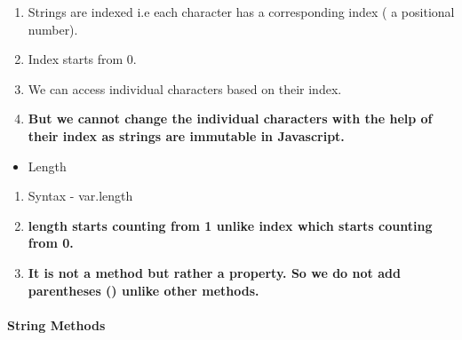 \documentclass[
  paper=a4,
  ,captions=tableheading
]{scrartcl}
\providecommand{\tightlist}{%
  \setlength{\itemsep}{0pt}\setlength{\parskip}{0pt}}
\begin{document}
\begin{enumerate}
\def\labelenumi{\arabic{enumi}.}
\tightlist
\item
  Strings are indexed i.e each character has a corresponding index ( a
  positional number).
\item
  Index starts from 0.
\item
  We can access individual characters based on their index.
\item
  \textbf{But we cannot change the individual characters with the help
  of their index as strings are immutable in Javascript.}
\end{enumerate}

\begin{itemize}
\tightlist
\item
  Length
\end{itemize}

\begin{enumerate}
\def\labelenumi{\arabic{enumi}.}
\tightlist
\item
  Syntax - var.length
\item
  \textbf{length starts counting from 1 unlike index which starts
  counting from 0.}
\item
  \textbf{It is not a method but rather a property. So we do not add
  parentheses () unlike other methods.}
\end{enumerate}

\hypertarget{string-methods}{%
\paragraph{String Methods}\label{string-methods}}
\end{document}
